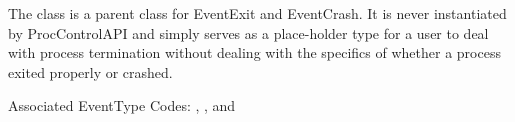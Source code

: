 
The  class is a parent class for EventExit and EventCrash.
It is never instantiated by ProcControlAPI and simply serves as a place-holder
type for a user to deal with process termination without dealing with the
specifics of whether a process exited properly or crashed.

Associated EventType Codes: , , and 
